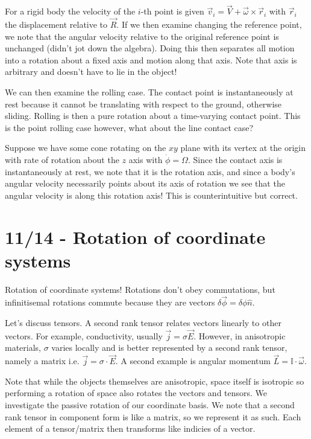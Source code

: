 \documentclass[10pt]{report}
\begin{document}
For a rigid body the velocity of the $i$-th point is given $\vec{v}_i = \vec{V} + \vec{\omega}\times \vec{r}_i$ with $\vec{r}_i$ the displacement relative to $\vec{R}$. If we then examine changing the reference point, we note that the angular velocity relative to the original reference point is unchanged (didn't jot down the algebra). Doing this then separates all motion into a rotation about a fixed axis and motion along that axis. Note that axis is arbitrary and doesn't have to lie in the object!

We can then examine the rolling case. The contact point is instantaneously at rest because it cannot be translating with respect to the ground, otherwise sliding. Rolling is then a pure rotation about a time-varying contact point. This is the point rolling case however, what about the line contact case?

Suppose we have some cone rotating on the $xy$ plane with its vertex at the origin with rate of rotation about the $z$ axis with $\dot{\phi} = \Omega$. Since the contact axis is instantaneously at rest, we note that it is the rotation axis, and since a body's angular velocity necessarily points about its axis of rotation we see that the angular velocity is along this rotation axis! This is counterintuitive but correct. 
\chapter{11/14 - Rotation of coordinate systems}

Rotation of coordinate systems! Rotations don't obey commutations, but infinitisemal rotations commute because they are vectors $\delta \vec{ \phi} = \delta\phi\hat{n}$. 

Let's discuss tensors. A second rank tensor relates vectors linearly to other vectors. For example, conductivity, usually $\vec{j} = \sigma\vec{E}$. However, in anisotropic materials, $\sigma$ varies locally and is better represented by a second rank tensor, namely a matrix i.e. $\vec{j} = \mathbb{\sigma} \cdot \vec{E}$. A second example is angular momentum $\vec{L} = \mathbb{I}\cdot \vec{\omega}$.

Note that while the objects themselves are anisotropic, space itself is isotropic so performing a rotation of space also rotates the vectors and tensors. We investigate the passive rotation of our coordinate basis. We note that a second rank tensor in component form is like a matrix, so we represent it as such. Each element of a tensor/matrix then transforms like indicies of a vector. 
\end{document}

